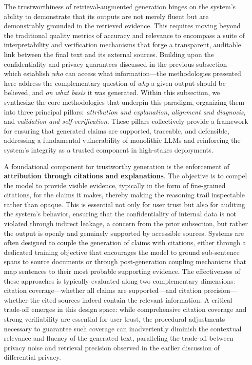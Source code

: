 \documentclass[11pt,a4paper]{article}
\begin{document}
The trustworthiness of retrieval-augmented generation hinges on the system's ability to demonstrate that its outputs are not merely fluent but are demonstrably grounded in the retrieved evidence. This requires moving beyond the traditional quality metrics of accuracy and relevance to encompass a suite of interpretability and verification mechanisms that forge a transparent, auditable link between the final text and its external sources. Building upon the confidentiality and privacy guarantees discussed in the previous subsection---which establish \emph{who} can access what information---the methodologies presented here address the complementary question of \emph{why} a given output should be believed, and \emph{on what basis} it was generated. Within this subsection, we synthesize the core methodologies that underpin this paradigm, organizing them into three principal pillars: \emph{attribution and explanation}, \emph{alignment and diagnosis}, and \emph{validation and self-verification}. These pillars collectively provide a framework for ensuring that generated claims are supported, traceable, and defensible, addressing a fundamental vulnerability of monolithic LLMs and reinforcing the system's integrity as a trusted component in high-stakes deployments.

A foundational component for trustworthy generation is the enforcement of \textbf{attribution through citations and explanations}. The objective is to compel the model to provide visible evidence, typically in the form of fine-grained citations, for the claims it makes, thereby making the reasoning trail inspectable rather than opaque. This is essential not only for user trust but also for auditing the system's behavior, ensuring that the confidentiality of internal data is not violated through indirect leakage, a concern from the prior subsection, but rather the output is openly and genuinely supported by accessible sources. Systems are often designed to couple the generation of claims with citations, either through a dedicated training objective that encourages the model to ground sub-sentence spans to source documents or through post-generation coupling mechanisms that map sentences to their most probable supporting evidence. The effectiveness of these approaches is typically evaluated along two complementary dimensions: citation coverage---whether all claims are supported---and citation precision---whether the cited sources indeed contain the relevant information. A critical trade-off emerges in this design space: while comprehensive citation coverage and strong verifiability are essential for user trust, the procedural adjustments necessary to guarantee such coverage can inadvertently diminish the contextual relevance and fluency of the generated text, paralleling the trade-off between privacy noise and retrieval precision observed in the earlier discussion of differential privacy.
\end{document}
